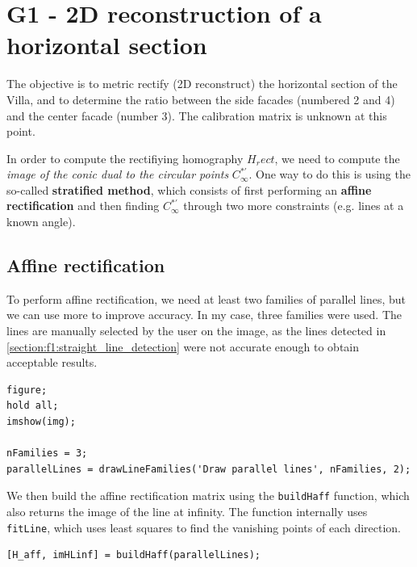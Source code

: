 \documentclass{Configuration_Files/PoliMi3i_thesis}
\begin{document}
\chapter{G1 - 2D reconstruction of a horizontal section}
\label{ch:g1}

The objective is to metric rectify (2D reconstruct) the horizontal section of the Villa, and to determine the ratio between the side facades (numbered 2 and 4) and the center facade (number 3). The calibration matrix is unknown at this point.

In order to compute the rectifiying homography $H_rect$, we need to compute the \emph{image of the conic dual to the circular points} $C^{*'}_\infty$. One way to do this is using the so-called \textbf{stratified method}, which consists of first performing an \textbf{affine rectification} and then finding $C^{*'}_\infty$ through two more constraints (e.g. lines at a known angle).

\section{Affine rectification}
To perform affine rectification, we need at least two families of parallel lines, but we can use more to improve accuracy. In my case, three families were used. The lines are manually selected by the user on the image, as the lines detected in \ref{section:f1:straight_line_detection} were not accurate enough to obtain acceptable results.

\begin{verbatim}
figure;
hold all;
imshow(img);

nFamilies = 3;
parallelLines = drawLineFamilies('Draw parallel lines', nFamilies, 2);
\end{verbatim}

We then build the affine rectification matrix using the \verb|buildHaff| function, which also returns the image of the line at infinity. The function internally uses \verb|fitLine|, which uses least squares to find the vanishing points of each direction.

\begin{verbatim}
[H_aff, imHLinf] = buildHaff(parallelLines);
\end{verbatim}
\end{document}
